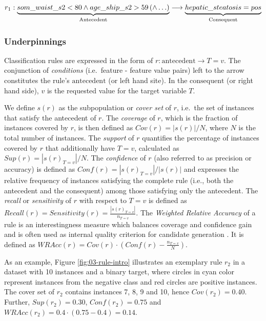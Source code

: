 \documentclass[
  oneside]{book}
\begin{document}
\begin{equation}
r_1: \underbrace{som\_waist\_s2 < 80 \wedge age\_ship\_s2 > 59 \left(\wedge \ldots \right)}_{\text{Antecedent}} \longrightarrow \underbrace{\vphantom{som\_waist\_s2 < 80 \wedge age\_ship\_s2 > 59 \left(\wedge \ldots \right)}hepatic\_steatosis = pos}_{\text{Consequent}}
\label{eq:03-rule}
\end{equation}

\hypertarget{underpinnings}{%
\subsubsection*{Underpinnings}\label{underpinnings}}

Classification rules are expressed in the form of \(r: \text{antecedent} \longrightarrow T=v\).
The conjunction of \emph{conditions} (i.e.~feature - feature value pairs) left to the arrow constitutes the rule's \(\text{antecedent}\) (or left hand site).
In the \(\text{consequent}\) (or right hand side), \(v\) is the requested value for the target variable \(T\).

We define \(s(r)\) as the subpopulation or \emph{cover set} of \(r\), i.e.~the set of instances that satisfy the antecedent of \(r\).
The \emph{coverage} of \(r\), which is the fraction of instances covered by \(r\), is then defined as \(Cov(r)=|s(r)|/N\), where \(N\) is the total number of instances.
The \emph{support} of \(r\) quantifies the percentage of instances covered by \(r\) that additionally have \(T=v\), calculated as \(Sup(r)=|s(r)_{T=v}|/N\).
The \emph{confidence} of \(r\) (also referred to as precision or accuracy) is defined as \(Conf(r)= |s(r)_{T=v}|/|s(r)|\) and expresses the relative frequency of instances satisfying the complete rule (i.e., both the antecedent and the consequent) among those satisfying only the antecedent.
The \emph{recall} or \emph{sensitivity} of \(r\) with respect to \(T=v\) is defined as \(Recall(r)=Sensitivity(r)=\frac{|s(r)_{T=v}|}{n_{T=v}}\).
The \emph{Weighted Relative Accuracy} of a rule is an interestingness measure which balances coverage and confidence gain and is often used as internal quality criterion for candidate generation \autocite{Herrera11}.
It is defined as \(WRAcc(r) = Cov(r)\cdot \left(Conf(r)-\frac{n_{T=v}}{N} \right)\).

As an example, Figure \ref{fig:03-rule-intro} illustrates an exemplary rule \(r_2\) in a dataset with 10 instances and a binary target, where circles in cyan color represent instances from the negative class and red circles are positive instances.
The cover set of \(r_2\) contains instances 7, 8, 9 and 10, hence \(Cov(r_2)=0.40\).
Further, \(Sup(r_2)=0.30\), \(Conf(r_2)=0.75\) and \(WRAcc(r_2)=0.4\cdot\left(0.75-0.4\right)=0.14\).
\end{document}
